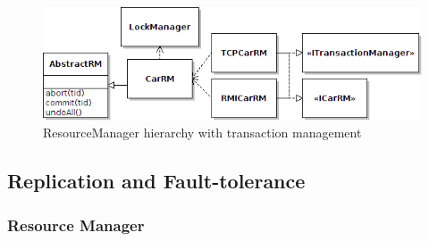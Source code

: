 \documentclass[a4paper]{article}
\begin{document}
\begin{figure}[h!]
  \centering
	\includegraphics[scale=0.6]{txncarrm.png}
  \caption{ResourceManager hierarchy with transaction management}
  \label{txncarrm}
\end{figure}

\subsection{Replication and Fault-tolerance}

\subsubsection{Resource Manager}
\end{document}
